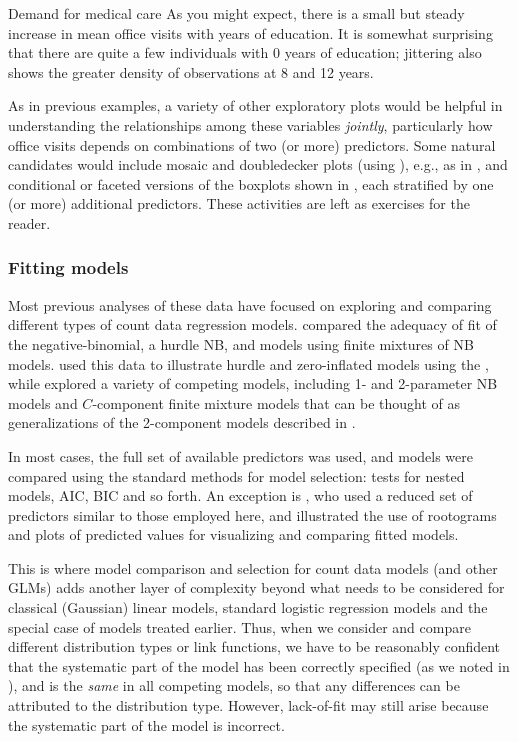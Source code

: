\documentclass[11pt]{book}\usepackage[]{graphicx}\usepackage[]{color}
\newenvironment{knitrout}{}{} %
\renewenvironment{knitrout}{\small\renewcommand{\baselinestretch}{.85}}{} %
\begin{document}
\begin{Example}[nmes1]{Demand for medical care}
\begin{knitrout}
\end{knitrout}
\noindent As you might expect, there is a small but steady increase in mean office visits with
years of education.  It is somewhat surprising that there are quite a few individuals
with 0 years of education; jittering also shows the greater density of observations at
8 and 12 years.

As in previous examples, a variety of other exploratory plots would be helpful in understanding
the relationships among these variables \emph{jointly}, particularly how office visits depends on
combinations of two (or more) predictors.  Some natural candidates would include
mosaic and doubledecker plots (using ), e.g., as in ,
and conditional or faceted versions of the boxplots shown in , each
stratified by one (or more) additional predictors. These activities are left as exercises for
the reader.

\end{Example}

\subsubsection{Fitting models}
Most previous analyses of these data have focused on exploring and comparing different types of
count data regression models.  \citet{DebTrivedi:1997} compared the adequacy of fit of the
negative-binomial, a hurdle NB, and models using finite mixtures of NB models.
\citet{Zeileis-etal:2008} used this data to illustrate hurdle and zero-inflated models using
the , while \citet{CameronTrivedi:1998,CameronTrivedi:2013} explored a variety of competing
models, including 1- and 2-parameter NB models and $C$-component finite mixture models
that can be thought of as generalizations of the 2-component models described in .

In most cases, the full set of available predictors was used, and models were compared using the
standard methods for model selection: \LR tests for nested models, AIC, BIC and so forth.
An exception is \citet{KleiberZeileis:2014}, who used a reduced set of predictors similar to
those employed here, and illustrated the use of rootograms and plots of predicted values
for visualizing and comparing fitted models.

This is where model comparison and selection for count data models (and other GLMs) adds another
layer of complexity beyond what needs to be considered for classical (Gaussian) linear models,
standard logistic regression models and the special case of \loglin models treated earlier.
Thus, when we consider and compare different distribution types or link functions, we have to
be reasonably confident that the systematic part of the model has been correctly specified
(as we noted in ), and is the \emph{same} in all competing models, so that
any differences can be attributed to the distribution type.  However, lack-of-fit may still
arise because the systematic part of the model is incorrect.
\end{document}

